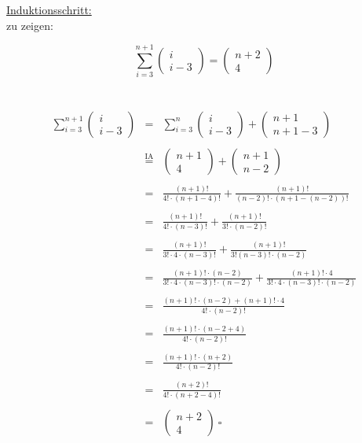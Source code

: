 \documentclass[a4paper]{scrartcl}
\newcommand{\qed}{\ \square}
\begin{document}
	\newpage
	\begin{flushleft}
		\underline{Induktionsschritt:} \\
		zu zeigen: 
	\end{flushleft}
	\[\sum\limits_{i=3}^{n+1} 
		\begin{pmatrix}
			i \\
			i-3
		\end{pmatrix}=
		\begin{pmatrix}
			n+2 \\
			4
		\end{pmatrix}\] \\ \\
	\[
	\begin{array}{rcl}
		\sum\limits_{i=3}^{n+1}
		\begin{pmatrix}
			i \\
			i-3
		\end{pmatrix}&=&
		\sum\limits_{i=3}^{n}
		\begin{pmatrix}
			i \\
			i-3
		\end{pmatrix}+
		\begin{pmatrix}
			n+1 \\
			n+1-3
		\end{pmatrix} \\ \\
		&\overset{\text{IA}}{=}&
		\begin{pmatrix}
			n+1 \\
			4
		\end{pmatrix}+
		\begin{pmatrix}
			n+1 \\
			n-2
		\end{pmatrix} \\ \\
		&=&\frac{(n+1)!}{4!\cdot(n+1-4)!}+\frac{(n+1)!}{(n-2)!\cdot (n+1-(n-2))!} \\ \\
		&=&\frac{(n+1)!}{4!\cdot(n-3)!}+\frac{(n+1)!}{3!\cdot (n-2)!} \\ \\
		&=&\frac{(n+1)!}{3!\cdot 4\cdot(n-3)!}+\frac{(n+1)!}{3!(n-3)!\cdot (n-2)} \\ \\
		&=&\frac{(n+1)!\cdot (n-2)}{3!\cdot 4\cdot(n-3)!\cdot (n-2)}+\frac{(n+1)!\cdot 4}{3!\cdot 
			4\cdot (n-3)!\cdot(n-2)} \\ \\
		&=&\frac{(n+1)!\cdot (n-2)+(n+1)!\cdot 4}{4!\cdot (n-2)!} \\ \\
		&=&\frac{(n+1)!\cdot (n-2+4)}{4!\cdot (n-2)!} \\ \\
		&=&\frac{(n+1)!\cdot (n+2)}{4!\cdot (n-2)!} \\ \\
		&=&\frac{(n+2)!}{4!\cdot (n+2-4)!} \\ \\
		&=&
		\begin{pmatrix}
			n+2 \\
			4
		\end{pmatrix}\qed
	\end{array}
	\] \\
	
\end{document}
